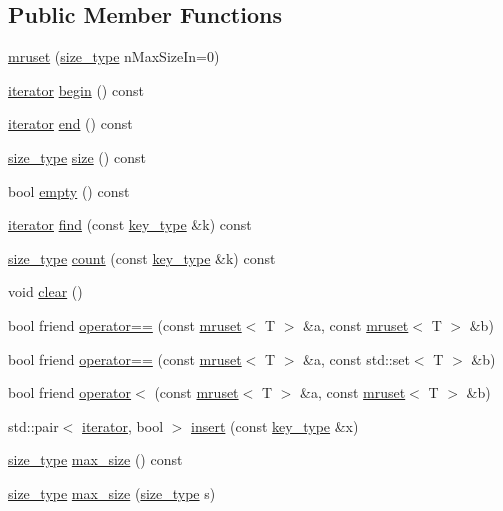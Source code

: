 \subsection*{Public Member Functions}
\begin{DoxyCompactItemize}
\item 
\hyperlink{classmruset_a708b11a33448c283f6f4c8e18fd3098f}{mruset} (\hyperlink{classmruset_aaee46af18d8a5bdc503e9570e499a335}{size\+\_\+type} n\+Max\+Size\+In=0)
\item 
\hyperlink{classmruset_a246172eda1afff45be47a013c14b1ad6}{iterator} \hyperlink{classmruset_acaa144dd3b3c3b9999254b6fcc37be5f}{begin} () const 
\item 
\hyperlink{classmruset_a246172eda1afff45be47a013c14b1ad6}{iterator} \hyperlink{classmruset_ab52cef4e172f0a8428451ac3cc2e3033}{end} () const 
\item 
\hyperlink{classmruset_aaee46af18d8a5bdc503e9570e499a335}{size\+\_\+type} \hyperlink{classmruset_a7739fdd19c7f28ccfa5565969106c3a9}{size} () const 
\item 
bool \hyperlink{classmruset_a3dc4b001997d723fd8c79134ac54574f}{empty} () const 
\item 
\hyperlink{classmruset_a246172eda1afff45be47a013c14b1ad6}{iterator} \hyperlink{classmruset_a030a8b36c8c34ae7b7b30cc0b0204bfa}{find} (const \hyperlink{classmruset_a282941ee7f0438b0c09274b10c78cda0}{key\+\_\+type} \&k) const 
\item 
\hyperlink{classmruset_aaee46af18d8a5bdc503e9570e499a335}{size\+\_\+type} \hyperlink{classmruset_abf122b956abffbf3ce190c80d215660c}{count} (const \hyperlink{classmruset_a282941ee7f0438b0c09274b10c78cda0}{key\+\_\+type} \&k) const 
\item 
void \hyperlink{classmruset_ac7a85b54646e9d9d1962ce7f30b2a1fc}{clear} ()
\item 
bool friend \hyperlink{classmruset_aced009504f86176bd82426aa24a38e37}{operator==} (const \hyperlink{classmruset}{mruset}$<$ T $>$ \&a, const \hyperlink{classmruset}{mruset}$<$ T $>$ \&b)
\item 
bool friend \hyperlink{classmruset_a4d7231441276ef8a6c0fa3edf9712f5c}{operator==} (const \hyperlink{classmruset}{mruset}$<$ T $>$ \&a, const std\+::set$<$ T $>$ \&b)
\item 
bool friend \hyperlink{classmruset_a5a95239f76da8ba675ba748baf1f07c8}{operator$<$} (const \hyperlink{classmruset}{mruset}$<$ T $>$ \&a, const \hyperlink{classmruset}{mruset}$<$ T $>$ \&b)
\item 
std\+::pair$<$ \hyperlink{classmruset_a246172eda1afff45be47a013c14b1ad6}{iterator}, bool $>$ \hyperlink{classmruset_af2e0dfe9d8b029bde78457797cdc42a9}{insert} (const \hyperlink{classmruset_a282941ee7f0438b0c09274b10c78cda0}{key\+\_\+type} \&x)
\item 
\hyperlink{classmruset_aaee46af18d8a5bdc503e9570e499a335}{size\+\_\+type} \hyperlink{classmruset_a6c802b89a72c474bdfad1059be1dec09}{max\+\_\+size} () const 
\item 
\hyperlink{classmruset_aaee46af18d8a5bdc503e9570e499a335}{size\+\_\+type} \hyperlink{classmruset_a030aa4599dfb54074183e2cdfbe2373f}{max\+\_\+size} (\hyperlink{classmruset_aaee46af18d8a5bdc503e9570e499a335}{size\+\_\+type} s)
\end{DoxyCompactItemize}
